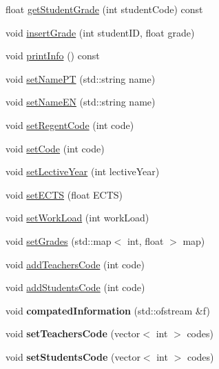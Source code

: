 \begin{DoxyCompactItemize}
float \hyperlink{classSubject_a625235d561cd4266a23cc6a09fddadc8}{get\+Student\+Grade} (int student\+Code) const
\item 
void \hyperlink{classSubject_ae0571c4d3b1b46c48dc4bc540d450294}{insert\+Grade} (int student\+ID, float grade)
\item 
void \hyperlink{classSubject_af96ca779862097e5cc1bb2b457ba08a2}{print\+Info} () const
\item 
void \hyperlink{classSubject_afbae90dc81a1ceb1f5ccf0099639e265}{set\+Name\+PT} (std\+::string name)
\item 
void \hyperlink{classSubject_af9e9958808eccfa4afaf702f560b0e6d}{set\+Name\+EN} (std\+::string name)
\item 
void \hyperlink{classSubject_a6d2cf53e66fdb1ac6658c03d5be73b3e}{set\+Regent\+Code} (int code)
\item 
void \hyperlink{classSubject_aecdbb1db33e14fd380bcb607a33c86e8}{set\+Code} (int code)
\item 
void \hyperlink{classSubject_acf269c84f61028d400856b94677e6422}{set\+Lective\+Year} (int lective\+Year)
\item 
void \hyperlink{classSubject_ab2b31d04366a75b679f1eec77783e0bf}{set\+E\+C\+TS} (float E\+C\+TS)
\item 
void \hyperlink{classSubject_aafa4294e098c5c1257a8b5ba75ff1cb6}{set\+Work\+Load} (int work\+Load)
\item 
void \hyperlink{classSubject_af4e5480d466cd44214dd006bec2f891a}{set\+Grades} (std\+::map$<$ int, float $>$ map)
\item 
void \hyperlink{classSubject_a1799fa0aaa5f81dd370bab999be15c43}{add\+Teachers\+Code} (int code)
\item 
void \hyperlink{classSubject_afa7d78b9fed5b72cfebf3d19fe03d22f}{add\+Students\+Code} (int code)
\item 
\mbox{\label{classSubject_a5d9a4918eeb1e276ca0d43427bb5ce82}} 
void {\bfseries compated\+Information} (std\+::ofstream \&f)
\item 
\mbox{\label{classSubject_a87390cb731f0c7c2c083ee202fcb4262}} 
void {\bfseries set\+Teachers\+Code} (vector$<$ int $>$ codes)
\item 
\mbox{\label{classSubject_a4e033c353b3c1b2c670a29233854872d}} 
void {\bfseries set\+Students\+Code} (vector$<$ int $>$ codes)
\end{DoxyCompactItemize}
